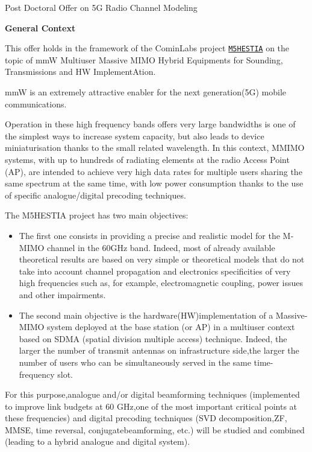 \documentclass[10pt,stdletter,dateno,sigleft]{newlfm} %
\begin{document}
\begin{newlfm}
\vspace{-4cm}
\begin{center}
{ \Large Post Doctoral Offer on 5G Radio Channel Modeling } 
\end{center}

{\bf General Context}

This offer holds in the framework of the CominLabs project {\tt \href{http://www.m5hstia.cominlabs.ueb.eu/}{M5HESTIA}} on the topic of
mmW Multi­user Massive MIMO Hybrid Equipments for Sounding, Transmissions and HW ImplementAtion.

mmW is an extremely attractive enabler for the next generation(5G) mobile communications.

Operation in these high frequency bands offers very large bandwidths
is one of the simplest ways to increase system capacity, but also
leads to device miniaturisation thanks to the small related wavelength.
In this context, M­MIMO systems, with up to hundreds of radiating
elements at the radio Access Point (AP), are intended to achieve
very high data rates for multiple users sharing the same spectrum at the
same time, with low power consumption  thanks to the use of specific analogue/digital precoding
techniques.

The M5HESTIA project has two main objectives:

\begin{itemize}
	\item The first one consists in providing a precise and realistic model for the M­MIMO channel in the 60­GHz band. Indeed, most of already­ available theoretical results are based
	on very simple or theoretical models that do not take into
	account channel propagation and electronics specificities of very
	high frequencies such as, for example, electromagnetic
	coupling, power issues and other impairments. 

	\item The second main objective is the
		hardware(HW)implementation of a Massive-MIMO system
		deployed at the base station (or AP) in a multi­user
		context based on SDMA (spatial division multiple
		access) technique. Indeed, the larger the number of
		transmit antennas on infrastructure side,the larger the
	number of users who can be simultaneously served in the same time-frequency slot.
\end{itemize}
	For this purpose,analogue and/or digital beamforming techniques
	(implemented to improve link budgets at 60 GHz,one of the
	most important critical points at these frequencies) and
	digital precoding techniques (SVD decomposition,ZF, MMSE, time
	reversal, conjugatebeamforming, etc.) will be studied and combined
	(leading to a hybrid analogue and digital system).


\end{newlfm}
\end{document}

